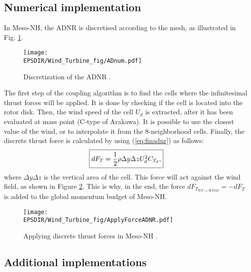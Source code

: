 \subsection{Numerical implementation}

In Meso-NH, the ADNR is discretised according to the mesh, as illustrated in Fig. \ref{fig:adnum}.
\begin{figure}[h]
\centering
\texttt{[image: \\EPSDIR/Wind\_Turbine\_fig/ADnum.pdf]}
\caption{Discretization of the ADNR \citep{joulin2019modelisation}.}
\label{fig:adnum}  
\end{figure}
\medbreak
The first step of the coupling algorithm is to find the cells where the infinitesimal thrust forces will be applied. It is done by checking if the cell is located into the rotor disk. Then, the wind speed of the cell $U_d$ is extracted, after it has been evaluated at mass point (C-type of Arakawa). It is possible to use the closest value of the wind, or to interpolate it from the 8-neighborhood cells. Finally, the discrete thrust force is calculated by using (\ref{eq:finadnr}) as follows:
\begin{equation}
\fbox{$
dF_T = \dfrac{1}{2} \rho \Delta y \Delta z U_d^2 C_{T_d},
$}	
\label{eq:adnrft}
\end{equation}
where $\Delta y \Delta z$ is the vertical area of the cell. This force will act against the wind field, as shown in Figure \ref{fig:appluforceadnr}. This is why, in the end, the force $dF_{T_{WT\rightarrow WIND}} = -dF_T$ is added to the global momentum budget of Meso-NH. 
\begin{figure}[h]
\centering
\texttt{[image: \\EPSDIR/Wind\_Turbine\_fig/ApplyForceADNR.pdf]}
\caption{Applying discrete thrust forces in Meso-NH \citep{joulin2019modelisation}.}
\label{fig:appluforceadnr}  
\end{figure}

\subsection{Additional implementations}
